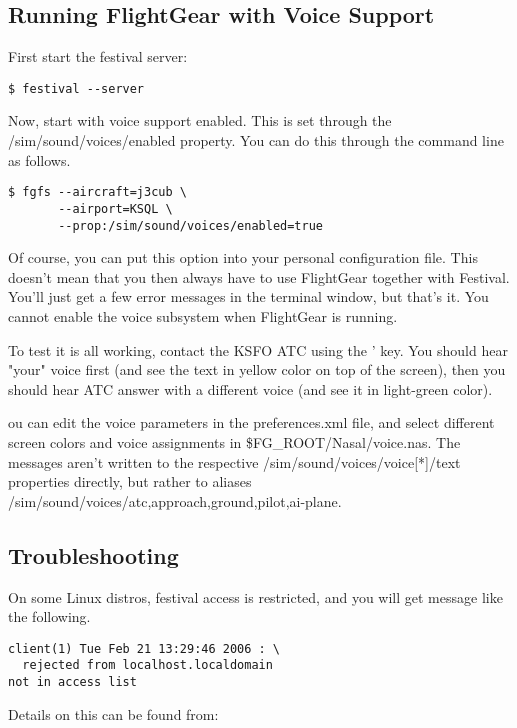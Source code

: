 \subsection{Running FlightGear with Voice Support}

First start the festival server:

\begin{verbatim}
$ festival --server
\end{verbatim}

Now, start \FlightGear{} with voice support enabled. This is set through the
/sim/sound/voices/enabled property. You can do this through the command line as follows.

\begin{verbatim}
$ fgfs --aircraft=j3cub \
       --airport=KSQL \
       --prop:/sim/sound/voices/enabled=true
\end{verbatim}

Of course, you can put this option into your personal configuration file.
This doesn't mean that you then always have to use FlightGear together with Festival.
You'll just get a few error messages in the terminal window, but that's it. You cannot enable
the voice subsystem when FlightGear is running.

To test it is all working, contact the KSFO ATC using the ' key. You should hear "your"
voice first (and see the text in yellow color on top of the screen), then you should hear
ATC answer with a different voice (and see it in light-green color).

ou can edit the voice parameters in the preferences.xml file, and select different screen colors
and voice assignments in \$FG\_ROOT/Nasal/voice.nas. The messages aren't written to the
respective /sim/sound/voices/voice[*]/text properties directly, but rather to aliases
/sim/sound/voices/{atc,approach,ground,pilot,ai-plane}.

\subsection{Troubleshooting}

On some Linux distros, festival access is restricted, and you will get message like the following.

\begin{verbatim}
client(1) Tue Feb 21 13:29:46 2006 : \
  rejected from localhost.localdomain
not in access list
\end{verbatim}

Details on this can be found from:

